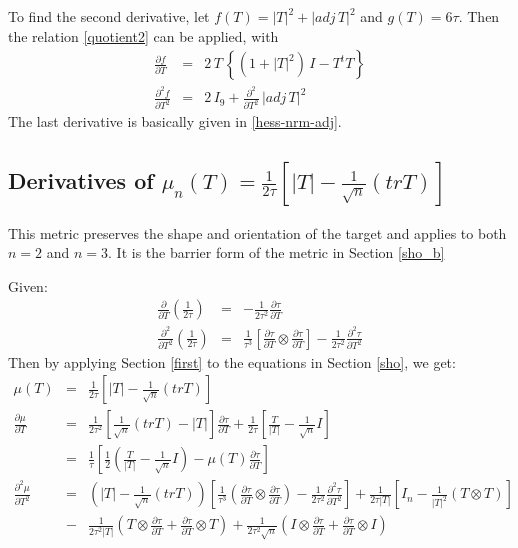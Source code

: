 \documentclass{report}
\begin{document}
\noindent To find the second derivative, let $f(T)=|T|^2 + |adj \, T|^2$ and
$g(T)=6 \tau$.  Then the relation \ref{quotient2} can be applied, with
\begin{eqnarray}
\frac{\partial f}{\partial T} & = & 2 \, T \, \left\{ \left( 1 + |T|^2 \right) \, I - T^t T \right\} \\
\frac{\partial^2 f}{\partial T^2} & = & 2 \, I_9 + \frac{\partial^2}{\partial T^2} \, |adj \, T|^2
\end{eqnarray}
The last derivative is basically given in \ref{hess-nrm-adj}. \newline

\subsection{\label{sho_b}Derivatives of $\mu_n(T) = \frac{1}{2 \tau}\left[|T| - \frac{1}{\sqrt{n}}(tr T)\right] $ }

\noindent This metric preserves the shape and orientation of the target and 
applies to both $n=2$ and $n=3$.  It is the barrier form of the metric in Section \ref{sho_b}\newline

\noindent Given:
\begin{eqnarray}
\frac{\partial}{\partial T}\left(\frac{1}{2 \tau}\right) &=& 
  -\frac{1}{2 \tau^2}\frac{\partial \tau}{\partial T} \\
\frac{\partial^2}{\partial T^2}\left(\frac{1}{2 \tau}\right) &=& \frac{1}{\tau^3}
  \left[\frac{\partial \tau}{\partial T} \otimes \frac{\partial \tau}{\partial T}\right]
  - \frac{1}{2 \tau^2} \frac{\partial^2 \tau}{\partial T^2} 
\end{eqnarray}
Then by applying Section \ref{first} to the equations in Section \ref{sho}, we get:
\begin{eqnarray}
\mu(T) &=& \frac{1}{2 \tau}\left[|T| - \frac{1}{\sqrt{n}}(tr T)\right] \\
\frac{\partial \mu}{\partial T} &=& \frac{1}{2 \tau^2}
        \left[\frac{1}{\sqrt{n}}\left(tr T\right) - |T|\right]\frac{\partial \tau}{\partial T}
        + \frac{1}{2 \tau}\left[\frac{T}{|T|} - \frac{1}{\sqrt{n}}I\right] \\
      &=& \frac{1}{\tau}\left[\frac{1}{2}\left(\frac{T}{|T|} - \frac{1}{\sqrt{n}}I\right)
        - \mu(T) \frac{\partial \tau}{\partial T}\right] \\
\nonumber
\frac{\partial^2 \mu}{\partial T^2} &=& 
  \left(|T|-\frac{1}{\sqrt{n}}(tr T)\right)
  \left[\frac{1}{\tau^3}\left(\frac{\partial \tau}{\partial T} \otimes \frac{\partial \tau}{\partial T}\right)
      - \frac{1}{2\tau^2}\frac{\partial^2 \tau}{\partial T^2}\right]
  + \frac{1}{2 \tau |T|}\left[I_n - \frac{1}{|T|^2}\left(T \otimes T\right)\right] \\
 &-&\frac{1}{2\tau^2|T|}\left(T \otimes \frac{\partial \tau}{\partial T} + \frac{\partial \tau}{\partial T} \otimes T\right)
  + \frac{1}{2\tau^2\sqrt{n}}\left(I \otimes \frac{\partial \tau}{\partial T} + \frac{\partial \tau}{\partial T} \otimes I\right)
\end{eqnarray}
\end{document}
